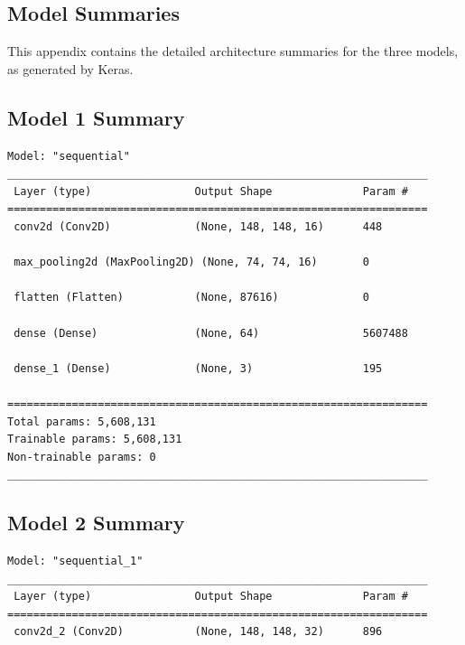 \documentclass[pdflatex,sn-mathphys-num]{sn-jnl}%
\theoremstyle{thmstyleone}%
\theoremstyle{thmstyletwo}%
\theoremstyle{thmstylethree}%
\begin{document}
\backmatter

\begin{appendices}

\section{Model Summaries}\label{secA1}

This appendix contains the detailed architecture summaries for the three models, as generated by Keras.

\subsection{Model 1 Summary}
\begin{verbatim}
Model: "sequential"
_________________________________________________________________
 Layer (type)                Output Shape              Param #   
=================================================================
 conv2d (Conv2D)             (None, 148, 148, 16)      448       
                                                                 
 max_pooling2d (MaxPooling2D) (None, 74, 74, 16)       0         
                                                                 
 flatten (Flatten)           (None, 87616)             0         
                                                                 
 dense (Dense)               (None, 64)                5607488   
                                                                 
 dense_1 (Dense)             (None, 3)                 195       
                                                                 
=================================================================
Total params: 5,608,131
Trainable params: 5,608,131
Non-trainable params: 0
_________________________________________________________________
\end{verbatim}

\subsection{Model 2 Summary}
\begin{verbatim}
Model: "sequential_1"
_________________________________________________________________
 Layer (type)                Output Shape              Param #   
=================================================================
 conv2d_2 (Conv2D)           (None, 148, 148, 32)      896       
                                                                 

\end{verbatim}
\end{appendices}
\end{document}
